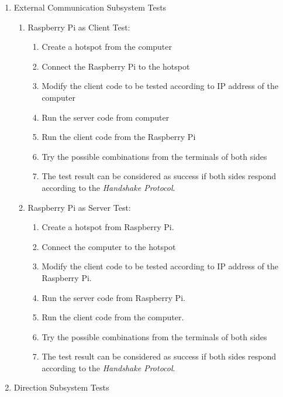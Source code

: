 \documentclass[a4paper,12pt]{article}
\begin{document}
\begin{enumerate}
	
	
	\item {External Communication Subsystem Tests}
		
		\begin{enumerate}
		
		\item Raspberry Pi as Client Test:

			\begin{enumerate}
				\item Create a hotspot from the computer  
				\item Connect the Raspberry Pi to the hotspot  
				\item Modify the client code to be tested according to IP address of the computer
				\item Run the server code from computer  
				\item Run the client code from the Raspberry Pi  
				\item Try the possible combinations from the terminals of both sides  
				\item The test result can be considered as success if both sides respond according to the \textit{Handshake Protocol}.
			\end{enumerate}		
		
		\item Raspberry Pi as Server Test:
			
			\begin{enumerate}
				\item Create a hotspot from Raspberry Pi.  
				\item Connect the computer to the hotspot  
				\item Modify the client code to be tested according to IP address of the Raspberry Pi.  
				\item Run the server code from Raspberry Pi.  
				\item Run the client code from the computer.  
				\item Try the possible combinations from the terminals of both sides  
				\item The test result can be considered as success if both sides respond according to the \textit{Handshake Protocol}. 
			\end{enumerate}	
		
		\end{enumerate}
		
	
	\item {Direction Subsystem Tests}
	\begin{enumerate}
	

\end{enumerate}
\end{enumerate}
\end{document}

